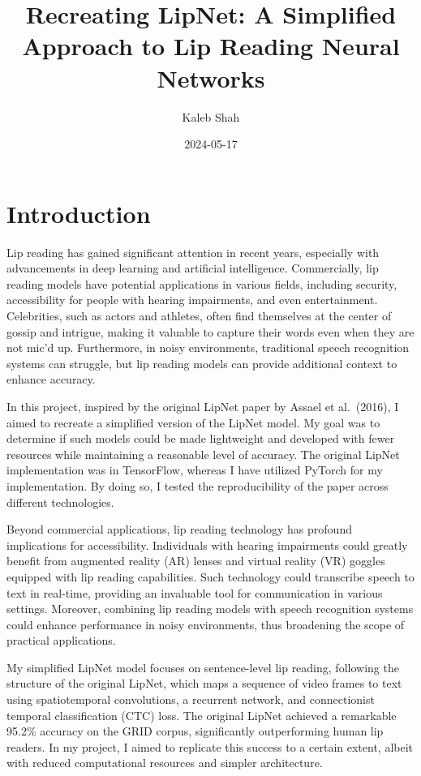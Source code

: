 \documentclass[
]{article}
\title{Recreating LipNet: A Simplified Approach to Lip Reading Neural
Networks}
\author{Kaleb Shah}
\date{2024-05-17}
\begin{document}
\maketitle

\newpage

\section{Introduction}\label{introduction}

Lip reading has gained significant attention in recent years, especially
with advancements in deep learning and artificial intelligence.
Commercially, lip reading models have potential applications in various
fields, including security, accessibility for people with hearing
impairments, and even entertainment. Celebrities, such as actors and
athletes, often find themselves at the center of gossip and intrigue,
making it valuable to capture their words even when they are not mic'd
up. Furthermore, in noisy environments, traditional speech recognition
systems can struggle, but lip reading models can provide additional
context to enhance accuracy.

In this project, inspired by the original LipNet paper by Assael et
al.~(2016), I aimed to recreate a simplified version of the LipNet
model. My goal was to determine if such models could be made lightweight
and developed with fewer resources while maintaining a reasonable level
of accuracy. The original LipNet implementation was in TensorFlow,
whereas I have utilized PyTorch for my implementation. By doing so, I
tested the reproducibility of the paper across different technologies.

Beyond commercial applications, lip reading technology has profound
implications for accessibility. Individuals with hearing impairments
could greatly benefit from augmented reality (AR) lenses and virtual
reality (VR) goggles equipped with lip reading capabilities. Such
technology could transcribe speech to text in real-time, providing an
invaluable tool for communication in various settings. Moreover,
combining lip reading models with speech recognition systems could
enhance performance in noisy environments, thus broadening the scope of
practical applications.

My simplified LipNet model focuses on sentence-level lip reading,
following the structure of the original LipNet, which maps a sequence of
video frames to text using spatiotemporal convolutions, a recurrent
network, and connectionist temporal classification (CTC) loss. The
original LipNet achieved a remarkable 95.2\% accuracy on the GRID
corpus, significantly outperforming human lip readers. In my project, I
aimed to replicate this success to a certain extent, albeit with reduced
computational resources and simpler architecture.
\end{document}
